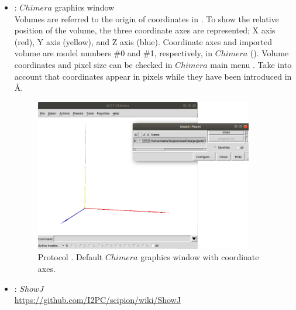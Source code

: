\begin{itemize}
   \begin{itemize}
   \item {}: $Chimera$ graphics window\\
   
   Volumes are referred to the origin of coordinates in \chimera. To show the relative position of the volume, the three coordinate axes are represented; X axis (red), Y axis (yellow), and Z axis (blue). Coordinate axes and imported volume are model numbers \#0 and \#1, respectively, in $Chimera$  (). Volume coordinates and pixel size can be checked in $Chimera$ main menu . Take into account that coordinates appear in pixels while they have been introduced in \AA.\\
   
   \begin{figure}[H]
   \centering 
    \captionsetup{width=.7\linewidth} 
    \includegraphics[width=0.90\textwidth]{Images_appendix/Fig102.pdf}
    \caption{Protocol . Default $Chimera$ graphics window with coordinate axes.}
    \label{fig:app_protocol_volume_3}
    \end{figure}
   
  \item {}: $ShowJ$\\
   
\url{https://github.com/I2PC/scipion/wiki/ShowJ}



\end{itemize}
\end{itemize}
